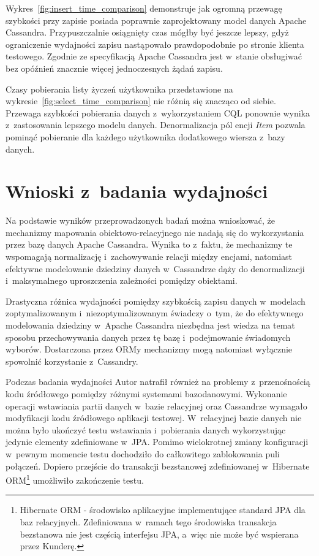Wykres~\ref{fig:insert_time_comparison} demonstruje jak ogromną przewagę szybkości przy zapisie posiada poprawnie zaprojektowany model danych Apache Cassandra. Przypuszczalnie osiągnięty czas mógłby być jeszcze lepszy, gdyż ograniczenie wydajności zapisu nastąpowało prawdopodobnie po stronie klienta testowego. Zgodnie ze specyfikacją Apache Cassandra jest w~stanie obsługiwać bez opóźnień znacznie więcej jednoczesnych żądań zapisu.

Czasy pobierania listy życzeń użytkownika przedstawione na wykresie~\ref{fig:select_time_comparison} nie różnią się znacząco od siebie. Przewaga szybkości pobierania danych z~wykorzystaniem CQL ponownie wynika z~zastosowania lepszego modelu danych. Denormalizacja pól encji \emph{Item} pozwala pominąć pobieranie dla każdego użytkownika dodatkowego wiersza z~bazy danych. 

\section{Wnioski z~badania wydajności}
\label{sec:cassandra_orm_performance_summary}

Na podstawie wyników przeprowadzonych badań można wnioskować, że mechanizmy mapowania obiektowo-relacyjnego nie nadają się do wykorzystania przez bazę danych Apache Cassandra. Wynika to z~faktu, że mechanizmy te wspomagają normalizację i~zachowywanie relacji między encjami, natomiast efektywne modelowanie dziedziny danych w~Cassandrze dąży do denormalizacji i~maksymalnego uproszczenia zależności pomiędzy obiektami.

Drastyczna różnica wydajności pomiędzy szybkością zapisu danych w~modelach zoptymalizowanym i~niezoptymalizowanym świadczy o~tym, że do efektywnego modelowania dziedziny w~Apache Cassandra niezbędna jest wiedza na temat sposobu przechowywania danych przez tę bazę i~podejmowanie świadomych wyborów. Dostarczona przez ORMy mechanizmy mogą natomiast wyłącznie spowolnić korzystanie z~Cassandry.

Podczas badania wydajności Autor natrafił również na problemy z~przenośnością kodu źródłowego pomiędzy różnymi systemami bazodanowymi. Wykonanie operacji wstawiania partii danych w~bazie relacyjnej oraz Cassandrze wymagało modyfikacji kodu źródłowego aplikacji testowej. W~relacyjnej bazie danych nie można było ukończyć testu wstawiania i~pobierania danych wykorzystując jedynie elementy zdefiniowane w~JPA. Pomimo wielokrotnej zmiany konfiguracji w~pewnym momencie testu dochodziło do całkowitego zablokowania puli połączeń. Dopiero przejście do transakcji bezstanowej zdefiniowanej w~Hibernate ORM\footnote{Hibernate ORM - środowisko aplikacyjne implementujące standard JPA dla baz relacyjnych. Zdefiniowana w~ramach tego środowiska transakcja bezstanowa nie jest częścią interfejsu JPA, a~więc nie może być wspierana przez Kunderę.} umożliwiło zakończenie testu.

